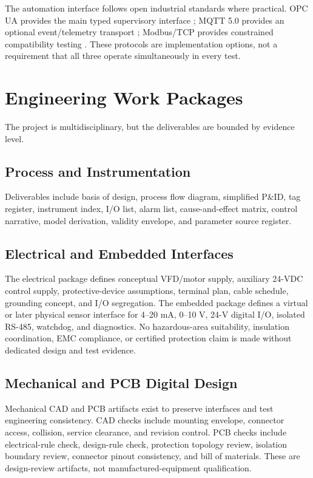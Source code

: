 \documentclass[conference]{IEEEtran}
\begin{document}
The automation interface follows open industrial standards where practical. OPC UA provides the main typed supervisory interface \cite{opcua}; MQTT 5.0 provides an optional event/telemetry transport \cite{mqtt5}; Modbus/TCP provides constrained compatibility testing \cite{modbus}. These protocols are implementation options, not a requirement that all three operate simultaneously in every test.

\section{Engineering Work Packages}
The project is multidisciplinary, but the deliverables are bounded by evidence level.

\subsection{Process and Instrumentation}
Deliverables include basis of design, process flow diagram, simplified P\&ID, tag register, instrument index, I/O list, alarm list, cause-and-effect matrix, control narrative, model derivation, validity envelope, and parameter source register.

\subsection{Electrical and Embedded Interfaces}
The electrical package defines conceptual VFD/motor supply, auxiliary 24-VDC control supply, protective-device assumptions, terminal plan, cable schedule, grounding concept, and I/O segregation. The embedded package defines a virtual or later physical sensor interface for 4--20 mA, 0--10 V, 24-V digital I/O, isolated RS-485, watchdog, and diagnostics. No hazardous-area suitability, insulation coordination, EMC compliance, or certified protection claim is made without dedicated design and test evidence.

\subsection{Mechanical and PCB Digital Design}
Mechanical CAD and PCB artifacts exist to preserve interfaces and test engineering consistency. CAD checks include mounting envelope, connector access, collision, service clearance, and revision control. PCB checks include electrical-rule check, design-rule check, protection topology review, isolation boundary review, connector pinout consistency, and bill of materials. These are design-review artifacts, not manufactured-equipment qualification.
\end{document}
